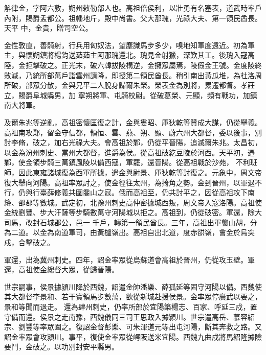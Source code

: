 
\begin{pinyinscope}

 斛律金，字阿六敦，朔州敕勒部人也。高祖倍侯利，以壯勇有名塞表，道武時率戶內附，賜爵孟都公。祖幡地斤，殿中尚書。父大那瑰，光祿大夫、第一領民酋長。天平
 中，金貴，贈司空公。



 金性敦直，善騎射，行兵用匈奴法，望塵識馬步多少，嗅地知軍度遠近。初為軍主，與懷朔鎮將楊鈞送茹茹主阿那瑰還北。瑰見金射獵，深歎其工。後瑰入寇高陸，金拒擊破之。正光末，破六韓拔陵構逆，金擁眾屬焉，陵假金王號。金度陵終敗滅，乃統所部萬戶詣雲州請降，即授第二領民酋長。稍引南出黃瓜堆，為杜洛周所破，部眾分散，金與兄平二人脫身歸爾朱榮。榮表金為別將，累遷都督。孝莊立，賜爵阜城縣男，加
 寧朔將軍、屯騎校尉。從破葛榮、元顯，頻有戰功，加鎮南大將軍。



 及爾朱兆等逆亂，高祖密懷匡復之計，金與婁昭、厙狄乾等贊成大謀，仍從舉義。高祖南攻鄴，留金守信都，領恒、雲、燕、朔、顯、蔚六州大都督，委以後事，別討李脩，破之，加右光祿大夫。會高祖於鄴，仍從平晉陽，追滅爾朱兆。太昌初，以金為汾州刺史、當州大都督，進爵為侯。從高祖破紇豆陵於河西。天平初，遷鄴，使金領步騎三萬鎮風陵以備西寇，軍罷，還晉陽。從高祖戰於沙苑，
 不利班師，因此東雍諸城復為西軍所據，遣金與尉景、厙狄乾等討復之。元象中，周文帝復大舉向河陽。高祖率眾討之，使金徑往太州，為掎角之勢。金到晉州，以軍退不行，仍與行臺薛修義共圍喬山之寇。俄而高祖至，仍共討平之，因從高祖攻下南絳、邵郡等數城。武定初，北豫州刺史高仲密據城西叛，周文帝入寇洛陽。高祖使金統劉豐、步大汗薩等步騎數萬守河陽城以拒之。高祖到，仍從破密。軍還，除大司馬，改封石城郡公，邑一
 千戶，轉第一領民酋長。三年，高祖出軍襲山胡，分為二道。以金為南道軍司，由黃櫨嶺出。高祖自出北道，度赤谼嶺，會金於烏突戍，合擊破之。



 軍還，出為冀州刺史。四年，詔金率眾從烏蘇道會高祖於晉州，仍從攻玉壁。軍還，高祖使金總督大眾，從歸晉陽。



 世宗嗣事，侯景據潁川降於西魏，詔遣金帥潘樂、薛孤延等固守河陽以備。西魏使其大都督李景和、若干寶領馬步數萬，欲從新城赴援侯景。金率眾停廣武以要之，景和等聞而退走。
 還為肆州刺史，仍率所部於宜陽築楊志、百家、呼延三戍，置守備而還。侯景之走南豫，西魏儀同三司王思政入據潁川。世宗遣高岳、慕容紹宗、劉豐等率眾圍之。復詔金督彭樂、可朱渾道元等出屯河陽，斷其奔救之路。又詔金率眾會攻潁川。事平，復使金率眾從崿阪送米宜陽。西魏九曲戍將馬紹隆據險要鬥，金破之。以功別封安平縣男。




\end{pinyinscope}
